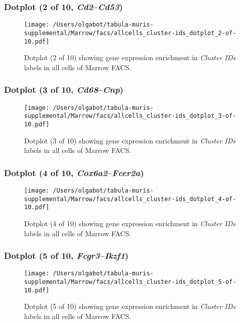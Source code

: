 \clearpage

\subsubsection{Dotplot (2 of 10, \emph{Cd2}--\emph{Cd53})}
\begin{figure}[h]
\centering
\texttt{[image: /Users/olgabot/tabula-muris-supplemental/Marrow/facs/allcells\_cluster-ids\_dotplot\_2-of-10.pdf]}

\caption{ Dotplot (2 of 10)  showing gene expression enrichment in \emph{Cluster IDs} labels in all cells of Marrow FACS. }
\end{figure}


\clearpage

\subsubsection{Dotplot (3 of 10, \emph{Cd68}--\emph{Cnp})}
\begin{figure}[h]
\centering
\texttt{[image: /Users/olgabot/tabula-muris-supplemental/Marrow/facs/allcells\_cluster-ids\_dotplot\_3-of-10.pdf]}

\caption{ Dotplot (3 of 10)  showing gene expression enrichment in \emph{Cluster IDs} labels in all cells of Marrow FACS. }
\end{figure}


\clearpage

\subsubsection{Dotplot (4 of 10, \emph{Cox6a2}--\emph{Fcer2a})}
\begin{figure}[h]
\centering
\texttt{[image: /Users/olgabot/tabula-muris-supplemental/Marrow/facs/allcells\_cluster-ids\_dotplot\_4-of-10.pdf]}

\caption{ Dotplot (4 of 10)  showing gene expression enrichment in \emph{Cluster IDs} labels in all cells of Marrow FACS. }
\end{figure}


\clearpage

\subsubsection{Dotplot (5 of 10, \emph{Fcgr3}--\emph{Ikzf1})}
\begin{figure}[h]
\centering
\texttt{[image: /Users/olgabot/tabula-muris-supplemental/Marrow/facs/allcells\_cluster-ids\_dotplot\_5-of-10.pdf]}

\caption{ Dotplot (5 of 10)  showing gene expression enrichment in \emph{Cluster IDs} labels in all cells of Marrow FACS. }
\end{figure}


